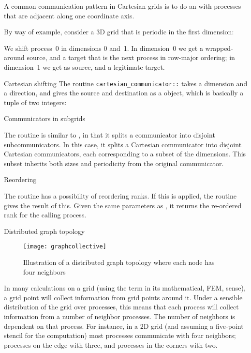 A common communication pattern in Cartesian grids is to
do an  with processes that are adjacent
along one coordinate axis.

By way of example, consider a 3D grid that is periodic in the first dimension:
%

We shift process~0 in dimensions 0 and~1.
In dimension~0 we get a wrapped-around source,
and a target that is the next process in row-major ordering;
in dimension~1 we get  as source,
and a legitimate target.
%

\begin{mplnote}{Cartesian shifting}
  The routine \lstinline{cartesian_communicator::}
  takes a dimension and a direction,
  and gives the source and destination
  as a  object, which is basically
  a tuple of two integers:
\end{mplnote}

 {Communicators in subgrids}

The routine  is similar to
, in that it splits a communicator
into disjoint subcommunicators.
In this case, it splits a Cartesian communicator
into disjoint Cartesian communicators,
each corresponding to a subset of the dimensions.
This subset inherits both sizes and periodicity from the original communicator.


 {Reordering}
\label{sec:mpi-cart-map}

The  routine has a possibility
of reordering ranks. If this is applied,
the routine  gives the result of this.
Given the same parameters as ,
it returns the re-ordered rank for the calling process.

 {Distributed graph topology}
\label{sec:mpi-dist-graph}

\begin{figure}[ht]
  \texttt{[image: graphcollective]}
  \caption{Illustration of a distributed graph topology where each node has four neighbors}
  \label{fig:graphcollective}
\end{figure}

In many calculations on a grid (using the term in its mathematical,
\ac{FEM}, sense), a grid point will collect information from grid
points around it. Under a sensible distribution of the grid over
processes, this means that each process will collect information from
a number of neighbor processes. The number of 
neighbors is dependent on that process. For instance, in a 2D
grid (and assuming a five-point stencil for the computation) most
processes communicate with four neighbors; processes on the edge with
three, and processes in the corners with two.

